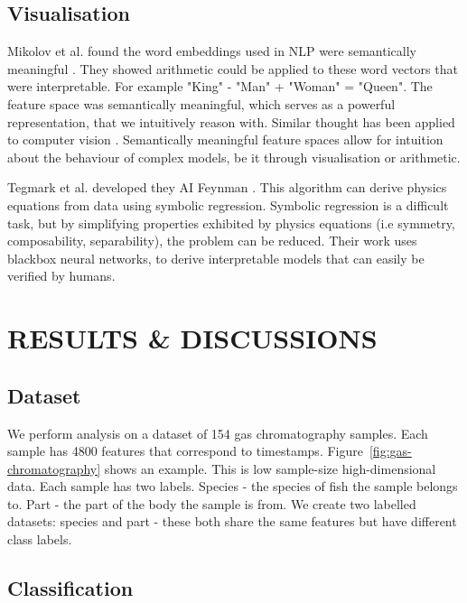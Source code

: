 \documentclass{article}
\begin{document}
\subsection{Visualisation}
\label{sec:related-visualisation}

Mikolov et al. found the word embeddings used in NLP were semantically meaningful \cite{mikolov2013linguistic}.
They showed arithmetic could be applied to these word vectors that were interpretable.
For example "King" - "Man" + "Woman" = "Queen".
The feature space was semantically meaningful, which serves as a powerful representation, that we intuitively reason with.
Similar thought has been applied to computer vision \cite{olah2018building, karras2020analyzing}.
Semantically meaningful feature spaces allow for intuition about the behaviour of complex models, be it through visualisation or arithmetic.

Tegmark et al. developed they AI Feynman \cite{udrescu2020ai}.
This algorithm can derive physics equations from data using symbolic regression.
Symbolic regression is a difficult task, but by simplifying properties exhibited by physics equations (i.e symmetry, composability, separability), the problem can be reduced.
Their work uses blackbox neural networks, to derive interpretable models that can easily be verified by humans.

\section{RESULTS \& DISCUSSIONS}
\label{sec:results}

\subsection{Dataset}

We perform analysis on a dataset of 154 gas chromatography samples.
Each sample has 4800 features that correspond to timestamps.
Figure~\ref{fig:gas-chromatography} shows an example.
This is low sample-size high-dimensional data.
Each sample has two labels.
Species - the species of fish the sample belongs to.
Part - the part of the body the sample is from.
We create two labelled datasets: species and part - these both share the same features but have different class labels.

\subsection{Classification}
\label{sec:results-classification}
\end{document}
